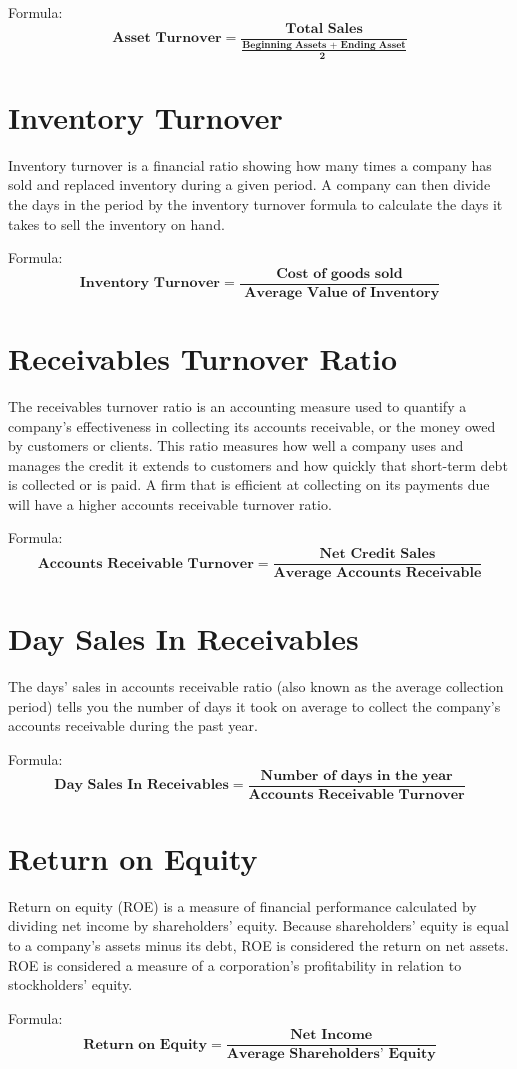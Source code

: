 \documentclass{article}
\begin{document}
Formula:
$$
\textbf{Asset Turnover} =  \frac{\textbf{Total Sales}}{\frac{\textbf{Beginning Assets + Ending Asset}}{\textbf{2 }}}
$$

\section{Inventory Turnover}
\label{sec:it}
Inventory turnover is a financial ratio showing how many times a company has sold and replaced inventory during a given period. A company can then divide the days in the period by the inventory turnover formula to calculate the days it takes to sell the inventory on hand. 
\par
\bigskip

Formula:
$$
\textbf{Inventory Turnover} =  \frac{\textbf{Cost of goods sold
}}{\textbf{ Average Value of Inventory}}
$$

\section{Receivables Turnover Ratio}
\label{sec:Rtr}
The receivables turnover ratio is an accounting measure used to quantify a company's effectiveness in collecting its accounts receivable, or the money owed by customers or clients. This ratio measures how well a company uses and manages the credit it extends to customers and how quickly that short-term debt is collected or is paid. A firm that is efficient at collecting on its payments due will have a higher accounts receivable turnover ratio. 
\par
\bigskip
Formula:
$$
\textbf{Accounts Receivable Turnover} =  \frac{\textbf{Net Credit Sales
}}{\textbf{Average Accounts Receivable}}
$$

\section{Day Sales In Receivables}
\label{sec:dsir}
The days' sales in accounts receivable ratio (also known as the average collection period) tells you the number of days it took on average to collect the company's accounts receivable during the past year. 
\par
\bigskip
Formula:
$$
\textbf{Day Sales In Receivables} =  \frac{\textbf{Number of days in the year}}{\textbf{Accounts Receivable Turnover
}}
$$

\section{Return on Equity}
\label{sec:roe}
Return on equity (ROE) is a measure of financial performance calculated by dividing net income by shareholders' equity. Because shareholders' equity is equal to a company’s assets minus its debt, ROE is considered the return on net assets. ROE is considered a measure of a corporation's profitability in relation to stockholders’ equity. 
\par
\bigskip
Formula:
$$
\textbf{Return on Equity} =  \frac{\textbf{Net Income}}{\textbf{Average Shareholders’ Equity
}}
$$
\end{document}
